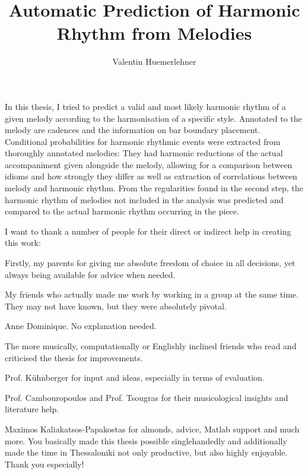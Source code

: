 \documentclass[a4paper,12pt]{report}
\title{Automatic Prediction of Harmonic Rhythm from Melodies}
\author{Valentin Huemerlehner}
\begin{document}
\beforepreface %

In this thesis, I tried to predict a valid and most likely harmonic rhythm of a given melody according to the harmonisation of a specific style. Annotated to the melody are cadences and the information on bar boundary placement. Conditional probabilities for harmonic rhythmic events were extracted from thoroughly annotated melodies: They had harmonic reductions of the actual accompaniment given alongside the melody, allowing for a comparison between idioms and how strongly they differ as well as extraction of correlations between melody and harmonic rhythm. From the regularities found in the second step, the harmonic rhythm of melodies not included in the analysis was predicted and compared to the actual harmonic rhythm occurring in the piece.

I want to thank a number of people for their direct or indirect help in creating this work:

Firstly, my parents for giving me absolute freedom of choice in all decisions, yet always being available for advice when needed.

My friends who actually made me work by working in a group at the same time. They may not have known, but they were absolutely pivotal.

Anne Dominique. No explanation needed.

The more musically, computationally or Englishly inclined friends who read and criticised the thesis for improvements.

Prof. Kühnberger for input and ideas, especially in terms of evaluation.

Prof. Cambouropoulos and Prof. Tsougras for their musicological insights and literature help.

Maximos Kaliakatsos-Papakostas for almonds, advice, Matlab support and much more. You basically made this thesis possible singlehandedly and additionally made the time in Thessaloniki not only productive, but also highly enjoyable. Thank you especially!

\afterpreface %
\newpage

\listoffigures

\end{document}
